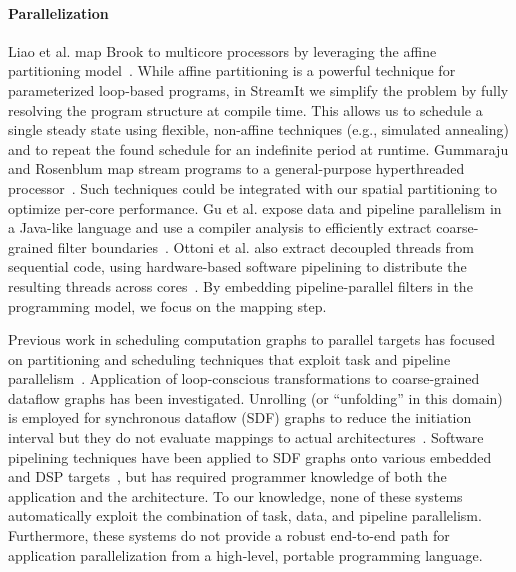 \paragraph*{Parallelization}  Liao et al. map Brook to multicore processors 
by leveraging the affine partitioning model~\cite{liao06brook}.  While
affine partitioning is a powerful technique for parameterized
loop-based programs, in StreamIt we simplify the problem by fully
resolving the program structure at compile time.  This allows us to
schedule a single steady state using flexible, non-affine techniques
(e.g., simulated annealing) and to repeat the found schedule for an
indefinite period at runtime.  Gummaraju and Rosenblum map stream
programs to a general-purpose hyperthreaded
processor~\cite{gummaraju05micro}.  Such techniques could be
integrated with our spatial partitioning to optimize per-core
performance.  Gu et al. expose data and pipeline parallelism in a
Java-like language and use a compiler analysis to efficiently extract
coarse-grained filter boundaries~\cite{du03sc}.  Ottoni et al. also
extract decoupled threads from sequential code, using hardware-based
software pipelining to distribute the resulting threads across
cores~\cite{ottoni05decoupled}.  By embedding pipeline-parallel
filters in the programming model, we focus on the mapping step.

Previous work in scheduling computation graphs to parallel targets has
focused on partitioning and scheduling techniques that exploit task
and pipeline parallelism~\cite{SDFSched,SDFSched2,may87communicating,
DAGSched, pipeline-sdf}.  Application of loop-conscious
transformations to coarse-grained dataflow graphs has been
investigated.  Unrolling (or ``unfolding'' in this domain) is employed
for synchronous dataflow (SDF) graphs to reduce the initiation
interval but they do not evaluate mappings to actual
architectures~\cite{unfolding,unfolding2}. Software pipelining
techniques have been applied to SDF graphs onto various embedded and
DSP targets~\cite{bakshi99,chatha-02}, but has required programmer
knowledge of both the application and the architecture. To our
knowledge, none of these systems automatically exploit the combination
of task, data, and pipeline parallelism.  Furthermore, these systems
do not provide a robust end-to-end path for application
parallelization from a high-level, portable programming language.

